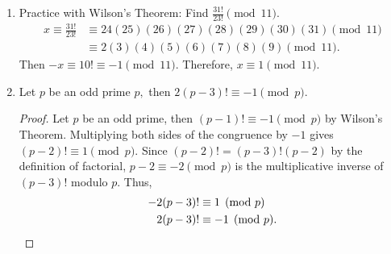\documentclass{ximera}
\begin{document}
\begin{example}
  \begin{enumerate}
    \item  Practice with Wilson's Theorem: 
    Find  $\frac{31!}{23!} \pmod{11}.$
    \begin{align*}
    x\equiv \frac{31!}{23!}	 & \equiv  24(25)(26)(27)(28)(29)(30)(31) \pmod{11}\\
          & \equiv  2(3)(4)(5)(6)(7)(8)(9) \pmod{11}.
    \end{align*}
    Then $-x\equiv 10! \equiv -1\pmod{11}.$ Therefore, $x\equiv 1\pmod{11}.$

    \item Let $p$ be an odd prime $p,$ then $2(p-3)!\equiv -1 \pmod{p}$.
    
    \begin{proof}
    Let $p$ be an odd prime, then $(p-1)!\equiv -1\pmod{p}$ by Wilson's Theorem. Multiplying both sides of the congruence by $-1$ gives $(p-2)!\equiv 1\pmod{p}.$ Since $(p-2)!=(p-3)!(p-2)$ by the definition of factorial, $p-2\equiv -2\pmod{p}$ is the multiplicative inverse of $(p-3)!$ modulo $p.$ Thus, 
    \begin{align*}
    -2(p-3)!	&\equiv 1\pmod{p}\\
    2(p-3)!	 & \equiv  -1\pmod{p}.\qedhere
    \end{align*}
    \end{proof}
  \end{enumerate}

\end{example}
\end{document}
